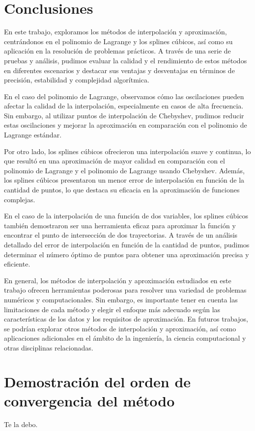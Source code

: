 \documentclass[12pt,a4]{article} %
\begin{document}
\begin{multicols}{2}
\section{Conclusiones}

En este trabajo, exploramos los métodos de interpolación y aproximación, centrándonos en el polinomio de Lagrange y los splines cúbicos, así como su aplicación en la resolución de problemas prácticos. A través de una serie de pruebas y análisis, pudimos evaluar la calidad y el rendimiento de estos métodos en diferentes escenarios y destacar sus ventajas y desventajas en términos de precisión, estabilidad y complejidad algorítmica.

En el caso del polinomio de Lagrange, observamos cómo las oscilaciones pueden afectar la calidad de la interpolación, especialmente en casos de alta frecuencia. Sin embargo, al utilizar puntos de interpolación de Chebyshev, pudimos reducir estas oscilaciones y mejorar la aproximación en comparación con el polinomio de Lagrange estándar.

Por otro lado, los splines cúbicos ofrecieron una interpolación suave y continua, lo que resultó en una aproximación de mayor calidad en comparación con el polinomio de Lagrange y el polinomio de Lagrange usando Chebyshev. Además, los splines cúbicos presentaron un menor error de interpolación en función de la cantidad de puntos, lo que destaca su eficacia en la aproximación de funciones complejas.

En el caso de la interpolación de una función de dos variables, los splines cúbicos también demostraron ser una herramienta eficaz para aproximar la función y encontrar el punto de intersección de dos trayectorias. A través de un análisis detallado del error de interpolación en función de la cantidad de puntos, pudimos determinar el número óptimo de puntos para obtener una aproximación precisa y eficiente.

En general, los métodos de interpolación y aproximación estudiados en este trabajo ofrecen herramientas poderosas para resolver una variedad de problemas numéricos y computacionales. Sin embargo, es importante tener en cuenta las limitaciones de cada método y elegir el enfoque más adecuado según las características de los datos y los requisitos de aproximación. En futuros trabajos, se podrían explorar otros métodos de interpolación y aproximación, así como aplicaciones adicionales en el ámbito de la ingeniería, la ciencia computacional y otras disciplinas relacionadas.

\appendix
\section{Demostración del orden de convergencia del método}
\label{demostracion}

Te la debo.

\printbibliography
\end{multicols}
\end{document}
